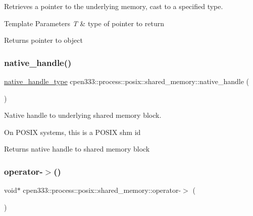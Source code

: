 Retrieves a pointer to the underlying memory, cast to a specified type. 


\begin{DoxyTemplParams}{Template Parameters}
{\em T} & type of pointer to return \\
\hline
\end{DoxyTemplParams}
\begin{DoxyReturn}{Returns}
pointer to object 
\end{DoxyReturn}
\mbox{\label{classcpen333_1_1process_1_1posix_1_1shared__memory_ac0dd258666565953b8c6bdbde7aa871f}} 
\subsubsection{\texorpdfstring{native\+\_\+handle()}{native\_handle()}}
{\footnotesize\ttfamily \hyperlink{classcpen333_1_1process_1_1posix_1_1shared__memory_a4bec0d0093c8bcfa3283a5da8ef1fc78}{native\+\_\+handle\+\_\+type} cpen333\+::process\+::posix\+::shared\+\_\+memory\+::native\+\_\+handle (\begin{DoxyParamCaption}{ }\end{DoxyParamCaption})\hspace{0.3cm}{\ttfamily [inline]}}



Native handle to underlying shared memory block. 

On P\+O\+S\+IX systems, this is a P\+O\+S\+IX shm id

\begin{DoxyReturn}{Returns}
native handle to shared memory block 
\end{DoxyReturn}
\mbox{\label{classcpen333_1_1process_1_1posix_1_1shared__memory_a0611e0aaf945ef86c803bb7907a99f98}} 
\subsubsection{\texorpdfstring{operator-\/$>$()}{operator->()}}
{\footnotesize\ttfamily void$\ast$ cpen333\+::process\+::posix\+::shared\+\_\+memory\+::operator-\/$>$ (\begin{DoxyParamCaption}{ }\end{DoxyParamCaption})\hspace{0.3cm}{\ttfamily [inline]}}



